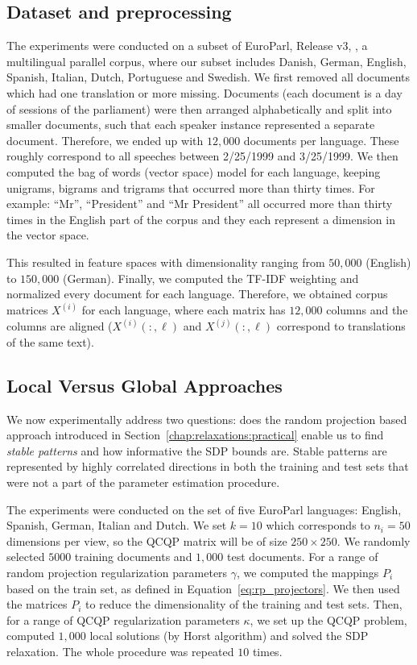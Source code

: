 \subsection{Dataset and preprocessing}
The experiments were conducted on a subset of EuroParl, Release v3,
\cite{europarl}, a multilingual parallel corpus, where our subset
includes Danish, German, English, Spanish, Italian, Dutch,
Portuguese and Swedish. We first removed all documents
which had one translation or more missing. Documents (each
document is a day of sessions of the parliament) were then
arranged alphabetically and split into smaller documents, such that
each speaker instance represented a separate document.
Therefore, we ended up with $12,000$ documents per
language. These roughly correspond to all speeches between 2/25/1999
and 3/25/1999. We then computed the bag of words (vector space)
\cite{Salton88term-weightingapproaches} model for each language,
keeping unigrams, bigrams and trigrams that occurred
more than thirty times. For example: ``Mr'', ``President'' and
``Mr President'' all occurred more than thirty times in the
English part of the corpus and they each represent a dimension in
the vector space.

This resulted in feature spaces with
dimensionality ranging from $50,000$ (English) to $150,000$
(German). Finally, we computed the TF-IDF weighting and normalized
every document for each language. Therefore, we obtained
corpus matrices $X^{(i)}$ for each language, where each
matrix has $12,000$ columns and the columns are aligned
($X^{(i)}\left(:,\ell\right)$ and $X^{(j)}\left(:,\ell\right)$ correspond to
translations of the same text).

\subsection{Local Versus Global Approaches}

We now experimentally address two questions: does the random projection
based approach introduced in Section~\ref{chap:relaxations:practical} enable us to
find \emph{stable patterns} and how informative the SDP
bounds are. Stable patterns are represented by highly correlated directions
in both the training and test sets that were not a part of the parameter
estimation procedure.

The experiments were conducted on the set of five EuroParl
languages: English, Spanish, German, Italian and Dutch. We set
$k = 10$ which corresponds to $n_i = 50$ dimensions per view, so
the QCQP matrix will be of size $250 \times 250$. We randomly
selected $5000$ training documents and $1,000$ test documents.  For
a range of random projection regularization parameters $\gamma$,
we computed the mappings $P_i$ based on the train set, as defined in
Equation~\ref{eq:rp_projectors}. We then used the matrices $P_i$ to
reduce the dimensionality of the training and test sets. Then, for
a range of QCQP regularization parameters $\kappa$, we set up the
QCQP problem, computed $1,000$ local solutions (by Horst
algorithm) and solved the SDP relaxation. The whole procedure was
repeated $10$ times.

